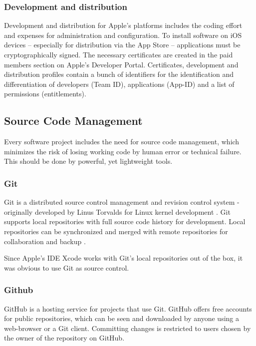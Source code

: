 \subsubsection{Development and distribution}
\label{sec:DAD}
Development and distribution for Apple's platforms includes the coding effort and expenses for administration and configuration. 
To install software on iOS devices – especially for distribution via the App Store – applications must be cryptographically signed. 
The necessary certificates are created in the paid members section on Apple's Developer Portal. 
Certificates, development and distribution profiles contain a bunch of identifiers for the identification and differentiation of developers (Team ID), 
applications (App-ID) and a list of permissions (entitlements). 

\subsection{Source Code Management}
\label{sec:SCM}

Every software project includes the need for source code management,
which minimizes the risk of losing working code
by human error or technical failure.
This should be done by powerful, yet lightweight tools.



\subsubsection{Git}

Git is a distributed source control management and revision control system 
- originally developed by Linus Torvalds for Linux kernel development \cite{Git:Main}.
Git supports local repositories with full source code history for development.
Local repositories can be synchronized and merged with remote repositories for collaboration and backup
\cite{Chacon:2009:PG:1618548}.

Since Apple's IDE Xcode works with Git's local repositories out of the box,
it was obvious to use Git as source control.

\subsubsection{Github}

GitHub \cite{GitHub:Main} is a hosting service for projects that use Git. 
GitHub offers free accounts for public repositories, 
which can be seen and downloaded by anyone
using a web-browser or a Git client.
Committing changes is restricted to users chosen by the owner of the repository on GitHub.


